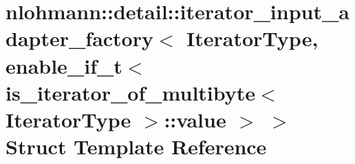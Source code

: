 \hypertarget{structnlohmann_1_1detail_1_1iterator__input__adapter__factory_3_01IteratorType_00_01enable__if__0e86378a778d78dd2284e92dc30f4902}{}\section{nlohmann\+:\+:detail\+:\+:iterator\+\_\+input\+\_\+adapter\+\_\+factory$<$ Iterator\+Type, enable\+\_\+if\+\_\+t$<$ is\+\_\+iterator\+\_\+of\+\_\+multibyte$<$ Iterator\+Type $>$\+:\+:value $>$ $>$ Struct Template Reference}
\label{structnlohmann_1_1detail_1_1iterator__input__adapter__factory_3_01IteratorType_00_01enable__if__0e86378a778d78dd2284e92dc30f4902}

